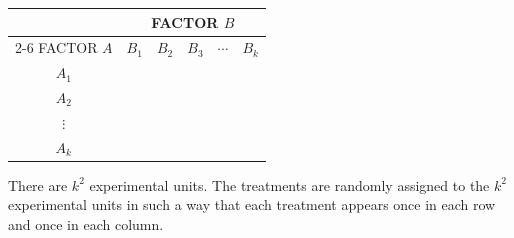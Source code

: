 \documentclass[11pt,a4paper]{article}
\theoremstyle{definition}
\begin{document}
\begin{table}[h!]
\centering
\begin{tabular}{|c|c|c|c|c|c|}
\hline
 & \multicolumn{5}{c|}{FACTOR $B$}\\
 \cline{2-6}
FACTOR $A$ & $B_1$ & $B_2$ & $B_3$ & $\cdots $ & $B_k$\\
\hline
$A_1$ &&&&&\\
$A_2$ &&&&&\\
$\vdots$ &&&&&\\
$A_k$ &&&&&\\
\hline 
\end{tabular}
\end{table}


There are $k^2$ experimental units. The treatments are randomly assigned to the $k^2$ experimental units in such a way that each treatment appears once in each row and once in each column.
\end{document}
